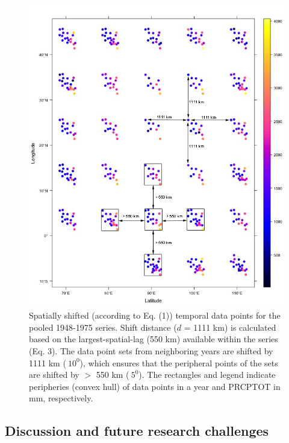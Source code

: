 \begin{figure}[h!]
  \centering
  \includegraphics[width=\textwidth]{Figures/Fig_3_5.png}
  \caption{Spatially shifted (according to Eq. (1)) temporal data points for the pooled 1948-1975 series. Shift distance ($d$ = 1111 km) is calculated based on the largest-spatial-lag (550 km) available within the series (Eq. 3). The data point sets from neighboring years are shifted by 1111 km ($~10^0$), which ensures that the peripheral points of the sets are shifted by $>$ 550 km ($~5^0$). The rectangles and legend indicate peripheries (convex hull) of data points in a year and PRCPTOT in mm, respectively.}
  \label{Fig_3_5}
\end{figure}

\subsection{Discussion and future research challenges}
\label{Discussion and future research challenges}

